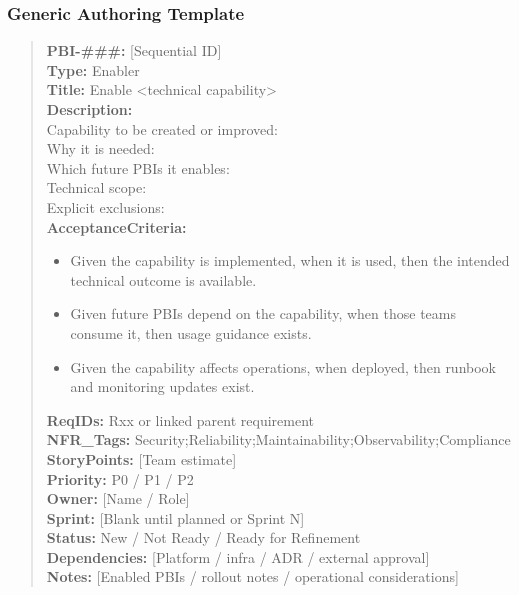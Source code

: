 \documentclass[11pt,a4paper]{article}
\begin{document}
\subsubsection*{Generic Authoring Template}
\begin{quote}
\textbf{PBI-\#\#\#:} [Sequential ID] \\
\textbf{Type:} Enabler \\
\textbf{Title:} Enable \textless technical capability\textgreater \\

\textbf{Description:} \\
Capability to be created or improved: \\
Why it is needed: \\
Which future PBIs it enables: \\
Technical scope: \\
Explicit exclusions: \\

\textbf{AcceptanceCriteria:}
\begin{itemize}[leftmargin=1.5em]
    \item Given the capability is implemented, when it is used, then the intended technical outcome is available.
    \item Given future PBIs depend on the capability, when those teams consume it, then usage guidance exists.
    \item Given the capability affects operations, when deployed, then runbook and monitoring updates exist.
\end{itemize}

\textbf{ReqIDs:} Rxx or linked parent requirement \\
\textbf{NFR\_Tags:} Security;Reliability;Maintainability;Observability;Compliance \\
\textbf{StoryPoints:} [Team estimate] \\
\textbf{Priority:} P0 / P1 / P2 \\
\textbf{Owner:} [Name / Role] \\
\textbf{Sprint:} [Blank until planned or Sprint N] \\
\textbf{Status:} New / Not Ready / Ready for Refinement \\
\textbf{Dependencies:} [Platform / infra / ADR / external approval] \\
\textbf{Notes:} [Enabled PBIs / rollout notes / operational considerations]
\end{quote}
\end{document}
